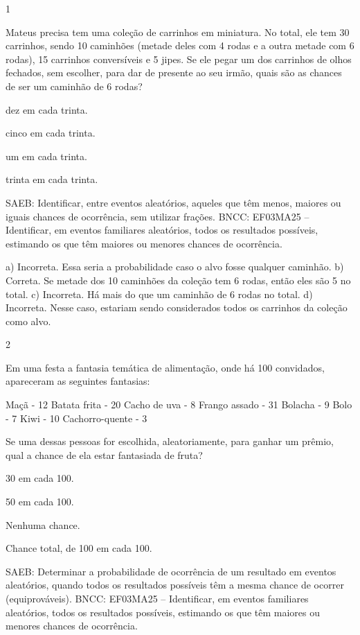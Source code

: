 \begin{multicols}{2}
{\begin{escolha}

\num{1}

Mateus precisa tem uma coleção de carrinhos em miniatura. No total, ele tem 30 carrinhos, sendo 10 caminhões (metade deles com 4 rodas e a outra metade com 6 rodas), 15 carrinhos conversíveis e 5 jipes. Se ele pegar um dos carrinhos de olhos fechados, sem escolher, para dar de presente ao seu irmão, quais são as chances de ser um caminhão de 6 rodas?

\begin{escolha}
\item
  dez em cada trinta.
\item
  cinco em cada trinta.
\item
  um em cada trinta.
\item
  trinta em cada trinta.
\end{escolha}

SAEB: Identificar, entre eventos aleatórios, aqueles que têm menos, maiores ou iguais chances de ocorrência, sem utilizar frações. 
BNCC: EF03MA25 -- Identificar, em eventos familiares aleatórios, todos os resultados possíveis,
estimando os que têm maiores ou menores chances de ocorrência.


a) Incorreta. Essa seria a probabilidade caso o alvo fosse qualquer caminhão.
b) Correta. Se metade dos 10 caminhões da coleção tem 6 rodas, então eles são 5 no total.
c) Incorreta. Há mais do que um caminhão de 6 rodas no total.
d) Incorreta. Nesse caso, estariam sendo considerados todos os carrinhos da coleção como alvo.

\num{2}

Em uma festa a fantasia temática de alimentação, onde há 100 convidados, apareceram as seguintes fantasias:

Maçã - 12
Batata frita - 20
Cacho de uva - 8
Frango assado - 31
Bolacha - 9
Bolo - 7
Kiwi - 10
Cachorro-quente - 3

  Se uma dessas pessoas for escolhida, aleatoriamente, para ganhar um prêmio, qual a chance de ela estar fantasiada de fruta?


\begin{escolha}
\item
30 em cada 100.
\item
50 em cada 100.
\item
Nenhuma chance.
\item
Chance total, de 100 em cada 100.
\end{escolha}

SAEB: Determinar a probabilidade de ocorrência de um resultado em eventos aleatórios, quando todos os resultados possíveis têm a mesma chance de ocorrer (equiprováveis).  
BNCC: EF03MA25 -- Identificar, em eventos familiares aleatórios, todos os resultados possíveis,
estimando os que têm maiores ou menores chances de ocorrência.


\end{escolha}}
\end{multicols}
